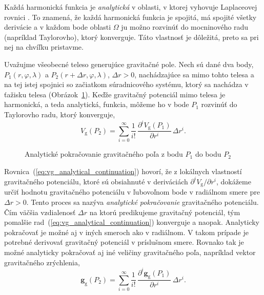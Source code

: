 \documentclass[a4paper, 12pt]{book}
\newcommand{\gidx}{\mathrm g}
\let\vec\mathbf
\begin{document}
Každá harmonická funkcia je \emph{analytická} v oblasti, v ktorej vyhovuje 
Laplaceovej rovnici \citep{MoritzPhysicalGeodesy}.  To znamená, že každá 
harmonická funkcia je spojitá, má spojité všetky derivácie a v každom bode 
oblasti $\Omega$ ju možno rozvinúť do mocninového radu (napríklad Taylorovho), 
ktorý konverguje.  Táto vlastnosť je dôležitá, preto sa pri nej na chvíľku 
pristavme.

Uvažujme všeobecné teleso generujúce gravitačné pole.  Nech sú dané dva body, 
$P_1(r, \varphi, \lambda)$ a $P_2(r + \Delta r, \varphi, \lambda)$, $\Delta 
r > 0$, nachádzajúce sa mimo tohto telesa a na tej istej spojnici so začiatkom 
súradnicového systému, ktorý sa nachádza v ťažisku telesa 
(Obrázok~\ref{fig:analytical_continuation}).  Keďže gravitačný potenciál mimo 
telesa je harmonická, a teda analytická, funkcia, môžeme ho v bode $P_1$ 
rozvinúť do Taylorovho radu, ktorý konverguje,
%
\begin{equation}
\label{eq:vg_analytical_continuation}
V_\gidx(P_2) = \sum_{i = 0}^\infty \frac{1}{i!} \, \frac{\partial^i 
V_\gidx(P_1)}{\partial r^i} \, \Delta r^i{.}
\end{equation}

\begin{figure}
\centering

\caption{Analytické pokračovanie gravitačného poľa z bodu $P_1$ do bodu $P_2$}
\label{fig:analytical_continuation}
\end{figure}

Rovnica~(\ref{eq:vg_analytical_continuation}) hovorí, že z lokálnych vlastností 
gravitačného potenciálu, ktoré sú obsiahnuté v deriváciách $\partial^i V_\gidx 
\slash \partial r^i$, dokážeme určiť hodnotu gravitačného potenciálu 
v ľubovoľnom bode v radiálnom smere pre $\Delta r > 0$.  Tento proces sa nazýva 
\emph{analytické pokračovanie} gravitačného potenciálu.  Čím väčšia vzdialenosť 
$\Delta r$ na ktorú predikujeme gravitačný potenciál, tým pomalšie 
rad~(\ref{eq:vg_analytical_continuation}) konverguje a naopak.  Analyticky 
pokračovať je možné aj v iných smeroch ako v radiálnom.  V takom prípade je 
potrebné derivovať gravitačný potenciál v príslušnom smere.  Rovnako tak je 
možné analyticky pokračovať aj iné veličiny gravitačného poľa, napríklad vektor 
gravitačného zrýchlenia,
%
\begin{equation}
\vec g_\gidx(P_2) = \sum_{i = 0}^{\infty} \frac{1}{i!} \, \frac{\partial^i \vec 
g_\gidx(P_1)}{\partial r^i} \, \Delta r^i{.}
\end{equation}
\end{document}
